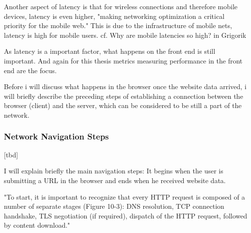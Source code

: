 
Another aspect of latency is that for wireless connections and therefore mobile devices, latency is even higher, "making networking optimization a critical priority for the mobile web." %
This is due to the infrastructure of mobile nets, latency is high for mobile users. cf.  Why are mobile latencies so high? in Grigorik %



As latency is a important factor, what happens on the front end is still important.
And again for this thesis metrics measuring performance in the front end are the focus.

Before i will discuss what happens in the browser once the website data arrived, i will briefly describe the preceding steps of establishing a connection between the browser (client) and the server, which can be considered to be still a part of the network.









\subsubsection{Network Navigation Steps}

[tbd]

I will explain briefly the main navigation steps: It begins when the user is submitting a URL in the browser and ends when he received website data.

"To start, it is important to recognize that every HTTP request is composed of a number of separate stages (Figure 10-3): DNS resolution, TCP connection handshake, TLS negotiation (if required), dispatch of the HTTP request, followed by content download." %





